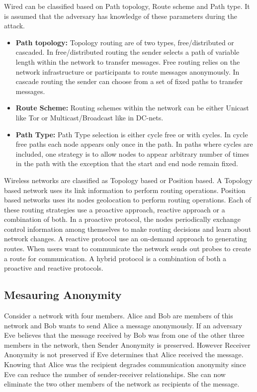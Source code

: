 \documentclass{llncs}
\begin{document}
Wired can be classified based on Path topology, Route scheme and Path type. It is assumed that the adversary has knowledge of these parameters during the attack. 
\begin{itemize}
	\item[]{\textbf{Path topology:} Topology routing are of two types, free/distributed or cascaded. In free/distributed routing the sender selects a path of variable length within the network to transfer messages. Free routing relies on the network infrastructure or participants to route messages anonymously. In cascade routing the sender can choose from a set of fixed paths to transfer messages.}
	\item[]{\textbf{Route Scheme:} Routing schemes within the network can be either Unicast like Tor or Multicast/Broadcast like in DC-nets. }
	\item[]{\textbf{Path Type:} Path Type selection is either cycle free or with cycles. In cycle free paths each node appears only once in the path. In paths where cycles are included, one strategy is to allow nodes to appear arbitrary number of times in the path with the exception that the start and end node remain fixed.}
\end{itemize}

Wireless networks are classified as Topology based or Position based. A Topology based network uses its link information to perform routing operations. Position based networks uses its nodes geolocation to perform routing operations. Each of these routing strategies use a proactive approach, reactive approach or a combination of both. In a proactive protocol, the nodes periodically exchange control information among themselves to make routing decisions and learn about network changes. A reactive protocol use an on-demand approach to generating routes. When users want to communicate the network sends out probes to create a route for communication. A hybrid protocol is a combination of both a proactive and reactive protocols.

\subsection{Mesauring Anonymity}
Consider a network with four members. Alice and Bob are members of this network and Bob wants to send Alice a message anonymously. If an adversary Eve believes that the message received by Bob was from one of the other three members in the network, then Sender Anonymity is preserved. However Receiver Anonymity is not preserved if Eve determines that Alice received the message.  Knowing that Alice was the recipient degrades communication anonymity since Eve can reduce the number of sender-receiver relationships. She can now eliminate the two other members of the network as recipients of the message.
\end{document}
